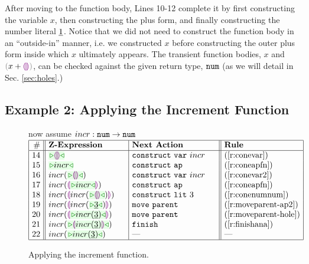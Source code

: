 After moving to the function body, Lines 10-12 complete it by first constructing the variable
$x$, then constructing the plus form, and finally constructing the number literal 
$\underline{1}$. Notice that we did not need to construct the function body in
an ``outside-in'' manner, i.e. we constructed $x$ before constructing the
outer plus form inside which $x$ ultimately appears. The transient function bodies, $x$ and $\hadd{x}{\hhole{}}$, can be checked against the given return type, $\texttt{num}$ (as we will detail in
Sec. \ref{sec:holes}.)


\subsection{Example 2: Applying the Increment Function}

\begin{figure}[t!]
  \label{ex2}
\begin{center}
\colorbox{light-gray}{\hspace{54px} now assume $incr : \texttt{num} \rightarrow \texttt{num}$ \hspace{53px}}
$\arraycolsep=4px
\begin{array}{|r||l|l||l|l|}
\hline
\# & \textbf{Z-Expression} &
\textbf{Next Action} & \textbf{Rule}
\\
\hline
14 &
\zwsel{\hhole{}} &
\aConstruct{\fvar{incr}} \hphantom{~\,\,~~}&
\text{(\ref{r:conevar})}
\\ 15 &
\zwsel{incr} &
\aConstruct{\fap} &
\text{(\ref{r:coneapfn})}
\\ 16 &
incr(\zwsel{\hhole{}}) &
\aConstruct{\fvar{incr}} &
\text{(\ref{r:conevar2})}
\\ 17 &
incr(\hhole{\zwsel{incr}}) &
\aConstruct{\fap} &
\text{(\ref{r:coneapfn})}
\\ 18 &
incr(\hhole{incr(\zwsel{\hhole{}})}) \hphantom{~~~~} &
\aConstruct{\fnumlit{3}} &
\text{(\ref{r:conenumnum})}
\\ 19 &
incr(\hhole{incr(\zwsel{\hnum{3}})}) &
\aMove{\dParent}&
\text{(\ref{r:moveparent-ap2})}
\\ 20 &
incr(\hhole{\zwsel{incr(\hnum{3})}}) &
\aMove{\dParent} &
\text{(\ref{r:moveparent-hole})}
\\ 21 &
incr(\zwsel{\hhole{incr(\hnum{3})}})&
\aFinish &
\text{(\ref{r:finishana})}
\\ 22 &
incr(\zwsel{incr(\hnum{3})}) &
\textrm{---} &
{\textrm{---}}
\\ \hline
\end{array}
$\end{center}\vspace{-6px}
\caption{Applying the increment function.}
\label{fig:second-example}
\end{figure}


